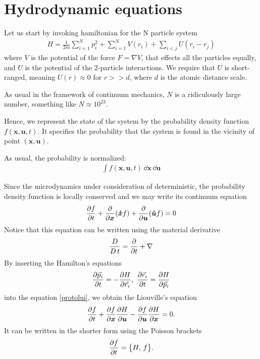 \chapter{Hydrodynamic equations}
Let us start by invoking hamiltonian for the N particle system
\begin{align*}
H = \frac{1}{2m} \sum_{i=1}^N p_i^2 + \sum_{i=1}^N V(r_i) + \sum_{i<j} U(r_i - r_j)
\end{align*}
where $V$ is the potential of the force $F=\nabla V$, that effects all the particles equally, and $U$ is the potential of the $2$-particle interactions. We require that $U$ is short-ranged, meaning $U(r) \approx 0$ for $r>>d$, where $d$ is the atomic distance scale.

As usual in the framework of continuum mechanics, $N$ is a ridiculously large number, something like $N \approx 10^{23}$.

Hence, we represent the state of the system by the probability density function $f(\bm{x},\bm{u},t)$. It specifies the probability that the system is found in the vicinity of point $(\bm{x},\bm{u})$.

As usual, the probability is normalized:
\begin{align*}
\int f(\bm{x},\bm{u},t) \, \dd\bm{x} \, \dd\bm{u}
\end{align*}

Since the microdynamics under consideration of deterministic, the probability density function is locally conserved and we may write its continuum equation
\begin{align} \label{protolui}
\frac{\partial f}{\partial t} + \frac{\partial}{\partial \bm{x}} (\bm{\dot{x}} f) + \frac{\partial}{\partial \bm{u}} (\bm{\dot{u}} f) = 0
\end{align}
Notice that this equation can be written using the material derivative
\begin{align*}
\frac{D}{D\,t} = \frac{\partial}{\partial t} + \nabla
\end{align*}
By inserting the Hamilton's equations 
\begin{align*}
\frac{\partial \vec{p}_i}{\partial t} = - \frac{\partial H}{\partial \vec{r}_i},~ \frac{\partial \vec{r}_i}{\partial t} = \frac{\partial H}{\partial \vec{p}_i}
\end{align*}
into the equation \ref{protolui}, we obtain the Liouville's equation
\begin{align*}
\frac{\partial f}{\partial t} + \frac{\partial f}{\partial \bm{x}} \frac{\partial H}{\partial \bm{u}} - \frac{\partial f}{\partial \bm{u}}\frac{\partial H}{\partial \bm{x}} = 0.
\end{align*}
It can be written in the shorter form using the Poisson brackets
\begin{align*}
\frac{\partial f}{\partial t} = \big\{ H, \, f \big\}.
\end{align*}

